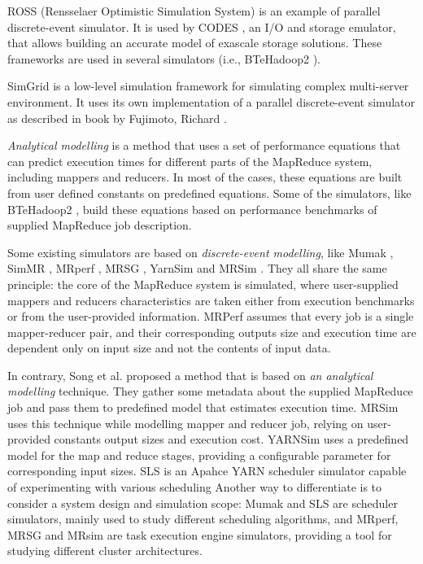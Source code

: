 \documentclass[conference]{IEEEtran} \IEEEoverridecommandlockouts
\begin{document}
    ROSS \cite{ross} (Rensselaer Optimistic Simulation System) is an example of
    parallel discrete-event simulator. It is used by CODES \cite{codes}, an I/O
    and storage emulator, that allows building an accurate model of exascale
    storage solutions. These frameworks are used in several simulators (i.e.,
    BTeHadoop2 \cite{baseline_model}).

    SimGrid \cite{simgrid} is a low-level simulation framework for simulating
    complex multi-server environment. It uses its own implementation of a
    parallel discrete-event simulator as described in book by Fujimoto, Richard
    \cite{fujimoto_parallel_1990}.

    \textit{Analytical modelling} is a method that uses a set of performance
    equations that can predict execution times for different parts of the
    MapReduce system, including mappers and reducers. In most of the cases,
    these equations are built from user defined constants on predefined
    equations. Some of the simulators, like BTeHadoop2 \cite{baseline_model},
    build these equations based on performance benchmarks of supplied MapReduce
    job description.

    Some existing simulators are based on \textit{discrete-event modelling},
    like Mumak \cite{mumak}, SimMR \cite{simmr}, MRperf \cite{mrperf}, MRSG
    , YarnSim \cite{yarnsim} and MRSim \cite{mrsim}. They all share
    the same principle: the core of the MapReduce system is simulated, where
    user-supplied mappers and reducers characteristics are taken either from
    execution benchmarks or from the user-provided information. MRPerf assumes
    that every job is a single mapper-reducer pair, and their corresponding
    outputs size and execution time are dependent only on input size and not
    the contents of input data. 

    In contrary, Song et al. \cite{song} proposed a method that is based on
    \textit{an analytical modelling} technique. They gather some metadata about
    the supplied MapReduce job and pass them to predefined model that estimates
    execution time. MRSim uses this technique while modelling mapper and
    reducer job, relying on user-provided constants output sizes and execution
    cost. YARNSim uses a predefined model for the map and reduce stages,
    providing a configurable parameter for corresponding input sizes. SLS
    \cite{sls} is an Apahce YARN\cite{apache_yarn} scheduler simulator capable
    of experimenting with various scheduling Another way to differentiate is to
    consider a system design and simulation scope: Mumak and SLS\cite{sls} are
    scheduler simulators, mainly used to study different scheduling algorithms,
    and MRperf, MRSG and MRsim are task execution engine simulators, providing
    a tool for studying different cluster architectures.
\end{document}
